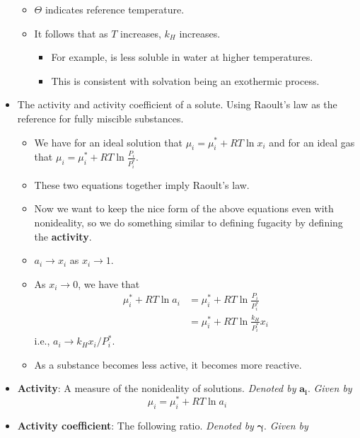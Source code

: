 \documentclass[../notes.tex]{subfiles}
\begin{document}
\begin{itemize}
    \begin{itemize}
        \item $\Theta$ indicates reference temperature.
        \item It follows that as $T$ increases, $k_H$ increases.
        \begin{itemize}
            \item For example,  is less soluble in water at higher temperatures.
            \item This is consistent with solvation being an exothermic process.
        \end{itemize}
    \end{itemize}
    \item The activity and activity coefficient of a solute. Using Raoult's law as the reference for fully miscible substances.
    \begin{itemize}
        \item We have for an ideal solution that $\mu_i=\mu_i^*+RT\ln x_i$ and for an ideal gas that $\mu_i=\mu_i^*+RT\ln\frac{P_i}{P_i^*}$.
        \item These two equations together imply Raoult's law.
        \item Now we want to keep the nice form of the above equations even with nonideality, so we do something similar to defining fugacity by defining the \textbf{activity}.
        \item $a_i\to x_i$ as $x_i\to 1$.
        \item As $x_i\to 0$, we have that
        \begin{align*}
            \mu_i^*+RT\ln a_i &= \mu_i^*+RT\ln\frac{P_i}{P_i^*}\\
            &= \mu_i^*+RT\ln\frac{k_H}{P_i^*}x_i
        \end{align*}
        i.e., $a_i\to k_Hx_i/P_i^*$.
        \item As a substance becomes less active, it becomes more reactive.
    \end{itemize}
    \item \textbf{Activity}: A measure of the nonideality of solutions. \emph{Denoted by} $\bm{a_i}$. \emph{Given by}
    \begin{equation*}
        \mu_i = \mu_i^*+RT\ln a_i
    \end{equation*}
    \item \textbf{Activity coefficient}: The following ratio. \emph{Denoted by} $\bm{\gamma}$. \emph{Given by}
    \begin{equation*}

\end{equation*}
\end{itemize}
\end{document}
